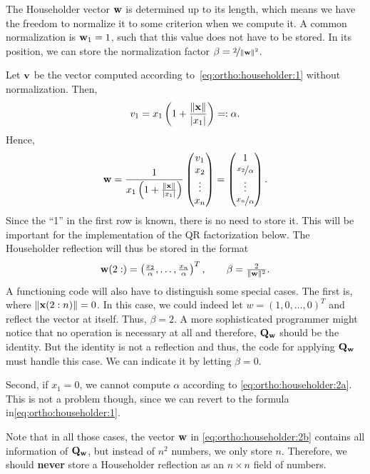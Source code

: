 \begin{intro}
  \label{intro:ortho:householder-storage}
  The Householder vector $\mathbf w$ is determined up to its length, which
  means we have the freedom to normalize it to some criterion when we
  compute it. A common normalization is $\mathbf w_1 = 1$, such that this
  value does not have to be stored. In its position, we can store the
  normalization factor $\beta = \nicefrac2{\lVert\mathbf w\rVert^2}$.

  Let $\mathbf v$ be the vector computed according
  to~\eqref{eq:ortho:householder:1} without normalization. Then,
  \begin{gather}
    \label{eq:ortho:householder:2a}
    v_1 = x_1 \left(1+ \frac{\lVert\mathbf x\rVert}{\lvert x_1\rvert}\right) =: \alpha.
  \end{gather}
  Hence,
  \begin{gather}
    \mathbf w = \frac1{x_1 \left(1+ \frac{\lVert\mathbf x\rVert}{\lvert x_1\rvert}\right)}
    \begin{pmatrix}
      v_1\\x_2\\\vdots\\x_n
    \end{pmatrix}
    =
    \begin{pmatrix}
      1 \\\nicefrac{x_2}{\alpha}\\\vdots\\\nicefrac{x_n}{\alpha}
    \end{pmatrix}
    .
  \end{gather}
  Since the ``1'' in the first row is known, there is no need to store
  it. This will be important for the implementation of the QR
  factorization below. The Householder reflection will thus be stored in the format
  \begin{gather}
    \label{eq:ortho:householder:2b}
    \mathbf w(2:) = \left(\tfrac{x_2}{\alpha},\dots,\tfrac{x_n}{\alpha}\right)^T, \qquad \beta = \tfrac2{\lVert\mathbf w\rVert^2}.
  \end{gather}
  A functioning code will also have to distinguish some special
  cases. The first is, where $\lVert\mathbf x(2:n)\rVert=0$. In this case, we
  could indeed let $w = (1,0,\dots,0)^T$ and reflect the vector at
  itself. Thus, $\beta = 2$. A more sophisticated programmer might
  notice that no operation is necessary at all and therefore,
  $\mathbf Q_{\mathbf w}$ should be the identity. But the identity is not a
  reflection and thus, the code for applying $\mathbf Q_{\mathbf w}$ must handle
  this case. We can indicate it by letting $\beta=0$.

  Second, if $x_1=0$, we cannot compute $\alpha$ according to
  \eqref{eq:ortho:householder:2a}. This is not a problem though, since
  we can revert to the formula in\eqref{eq:ortho:householder:1}.

  Note that in all those cases, the vector $\mathbf w$ in
  \eqref{eq:ortho:householder:2b} contains all information of
  $\mathbf Q_{\mathbf w}$, but instead of $n^2$ numbers, we only store
  $n$. Therefore, we should \textbf{never} store a Householder
  reflection as an $n\times n$ field of numbers.
\end{intro}

